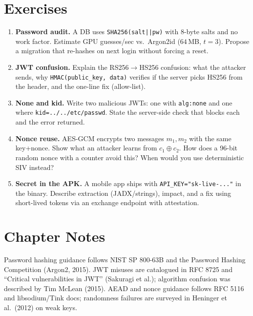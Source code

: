\section{Exercises}
\label{sec:ch05-exercises}
\begin{enumerate}[label=E5.\arabic*, leftmargin=*, itemsep=0.6em]
    \item \textbf{Password audit.} A DB uses \texttt{SHA256(salt||pw)} with 8-byte salts and no work factor. Estimate GPU guesses/sec vs.\ Argon2id ($64$\,MB, $t=3$). Propose a migration that re-hashes on next login without forcing a reset.
    \item \textbf{JWT confusion.} Explain the RS256$\to$HS256 confusion: what the attacker sends, why \texttt{HMAC(public\_key, data)} verifies if the server picks HS256 from the header, and the one-line fix (allow-list).
    \item \textbf{None and kid.} Write two malicious JWTs: one with \texttt{alg:none} and one where \texttt{kid=../../etc/passwd}. State the server-side check that blocks each and the error returned.
    \item \textbf{Nonce reuse.} AES-GCM encrypts two messages $m_1,m_2$ with the same key+nonce. Show what an attacker learns from $c_1 \oplus c_2$. How does a 96-bit random nonce with a counter avoid this? When would you use deterministic SIV instead?
    \item \textbf{Secret in the APK.} A mobile app ships with \texttt{API\_KEY="sk-live-..."} in the binary. Describe extraction (JADX/strings), impact, and a fix using short-lived tokens via an exchange endpoint with attestation.
\end{enumerate}

\section*{Chapter Notes}
Password hashing guidance follows NIST SP 800-63B and the Password Hashing Competition (Argon2, 2015). JWT misuses are catalogued in RFC 8725 and ``Critical vulnerabilities in JWT'' (Sakuragi et al.); algorithm confusion was described by Tim McLean (2015). AEAD and nonce guidance follows RFC 5116 and libsodium/Tink docs; randomness failures are surveyed in Heninger et al.\ (2012) on weak keys.

